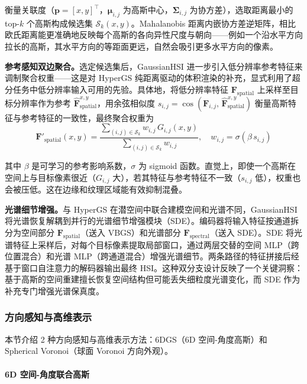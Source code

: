 衡量关联度（$\mathbf{p}=[x,y]^\top$，$\boldsymbol{\mu}_{i,j}$ 为高斯中心，$\boldsymbol{\Sigma}_{i,j}$ 为协方差），选取距离最小的 top-$k$ 个高斯构成候选集 $\mathcal{S}_k(x,y)$。Mahalanobis 距离内嵌协方差逆矩阵，相比欧氏距离能更准确地反映每个高斯的各向异性尺度与朝向——例如一个沿水平方向拉长的高斯，其水平方向的等距面更远，自然会吸引更多水平方向的像素。

\textbf{参考感知双边聚合。}选定候选集后，GaussianHSI 进一步引入低分辨率参考特征来调制聚合权重——这是对 HyperGS 纯距离驱动的体积渲染的补充，显式利用了超分任务中低分辨率输入可用的先验。具体地，将低分辨率特征 $\mathbf{F}_\text{spatial}$ 上采样至目标分辨率作为参考 $\hat{\mathbf{F}}^{x,y}_\text{spatial}$，用余弦相似度 $s_{i,j} = \cos(\mathbf{F}_{i,j},\, \hat{\mathbf{F}}^{x,y}_\text{spatial})$ 衡量高斯特征与参考特征的一致性，最终聚合权重为
\begin{equation}
\mathbf{F}'_\text{spatial}(x,y) = \frac{\sum_{(i,j)\in\mathcal{S}_k} w_{i,j}\,G_{i,j}(x,y)}{\sum_{(i,j)\in\mathcal{S}_k} w_{i,j}}, \quad w_{i,j} = \sigma(\beta\, s_{i,j})
\end{equation}

其中 $\beta$ 是可学习的参考影响系数，$\sigma$ 为 sigmoid 函数。直觉上，即使一个高斯在空间上与目标像素很近（$G_{i,j}$ 大），若其特征与参考特征不一致（$s_{i,j}$ 低），权重也会被压低。这在边缘和纹理区域能有效抑制混叠。

\textbf{光谱细节增强。}与 HyperGS 在潜空间中联合建模空间和光谱不同，GaussianHSI 将光谱恢复解耦到并行的光谱细节增强模块（SDE）。编码器将输入特征按通道拆分为空间部分 $\mathbf{F}_\text{spatial}$（送入 VBGS）和光谱部分 $\mathbf{F}_\text{spectral}$（送入 SDE）。SDE 将光谱特征上采样后，对每个目标像素提取局部窗口，通过两层交替的空间 MLP（跨位置混合）和光谱 MLP（跨通道混合）增强光谱细节。两条路径的特征拼接后经基于窗口自注意力的解码器输出最终 HSI。这种双分支设计反映了一个关键洞察：基于高斯的空间重建擅长恢复空间结构但可能丢失细粒度光谱变化，而 SDE 作为补充专门增强光谱保真度。

\subsubsection{方向感知与高维表示}

本节介绍 2 种方向感知与高维表示方法：6DGS（6D 空间-角度高斯）和 Spherical Voronoi（球面 Voronoi 方向外观）。

\paragraph{6D 空间-角度联合高斯}

